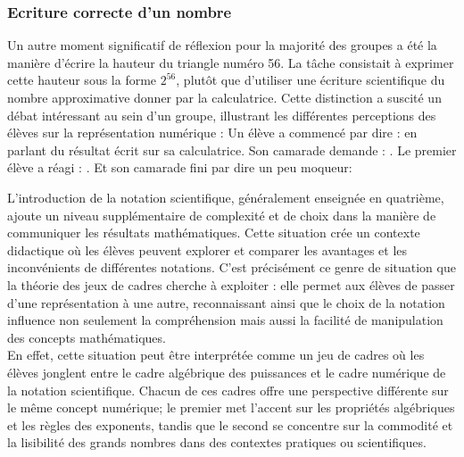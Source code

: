 \subsubsection{Ecriture correcte d'un nombre}

Un autre moment significatif de réflexion pour la majorité des groupes a été la manière d'écrire la hauteur du triangle numéro 56.
La tâche consistait à exprimer cette hauteur sous la forme $2^{56}$,
plutôt que d'utiliser une écriture scientifique du nombre approximative donner par la calculatrice.
Cette distinction a suscité un débat intéressant au sein d'un groupe,
illustrant les différentes perceptions des élèves sur la représentation numérique :
Un élève a commencé par dire :  en parlant du résultat écrit sur sa calculatrice.
Son camarade demande : .
Le premier élève a réagi : .
Et son camarade fini par dire un peu moqueur: 



L'introduction de la notation scientifique,
généralement enseignée en quatrième,
ajoute un niveau supplémentaire de complexité et de choix dans la manière de communiquer les résultats mathématiques.
Cette situation crée un contexte didactique où les élèves peuvent explorer et comparer les avantages et les inconvénients de différentes notations.
C'est précisément ce genre de situation que la théorie des jeux de cadres cherche à exploiter :
elle permet aux élèves de passer d'une représentation à une autre,
reconnaissant ainsi que le choix de la notation influence non seulement la compréhension mais aussi la facilité de manipulation des concepts mathématiques.\\

En effet,
cette situation peut être interprétée comme un jeu de cadres où les élèves jonglent entre le cadre algébrique des puissances et le cadre numérique de la notation scientifique.
Chacun de ces cadres offre une perspective différente sur le même concept numérique;
le premier met l'accent sur les propriétés algébriques et les règles des exponents,
tandis que le second se concentre sur la commodité et la lisibilité des grands nombres dans des contextes pratiques ou scientifiques.

